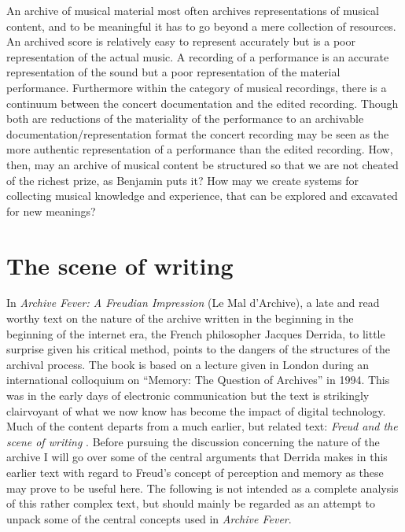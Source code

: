 \documentclass[11pt,a4paper]{article}
\begin{document}
An archive of musical material most often archives representations of musical content, and to be meaningful it has to go beyond a mere collection of resources. An archived score is relatively easy to represent accurately but is a poor representation of the actual music. A recording of a performance is an accurate representation of the sound but a poor representation of the material performance. Furthermore within the category of musical recordings, there is a continuum between the concert documentation and the edited recording. Though both are reductions of the materiality of the performance to an archivable documentation/representation format the concert recording may be seen as the more authentic representation of a performance than the edited recording. How, then, may an archive of musical content be structured so that we are not cheated of the richest prize, as Benjamin puts it? How may we create systems for collecting musical knowledge and experience, that can be explored and excavated for new meanings? 





\section*{The scene of writing}
\label{sec:scene-writing}

In \emph{Archive Fever: A Freudian Impression} (Le Mal d'Archive), a late and read worthy text on the nature of the archive written in the beginning in the beginning of the internet era, the French philosopher Jacques Derrida, to little surprise given his critical method, points to the dangers of the structures of the archival process. The book is based on a lecture given in London during an international colloquium on ``Memory: The Question of Archives'' in 1994. This was in the early days of electronic communication but the text is strikingly clairvoyant of what we now know has become the impact of digital technology. Much of the content departs from a much earlier, but related text: \emph{Freud and the scene of writing} \citep{der78}. Before pursuing the discussion concerning the nature of the archive I will go over some of the central arguments that Derrida makes in this earlier text with regard to Freud's concept of perception and memory as these may prove to be useful here. The following is not intended as a complete analysis of this rather complex text, but should mainly be regarded as an attempt to unpack some of the central concepts used in \emph{Archive Fever}.
\end{document}
